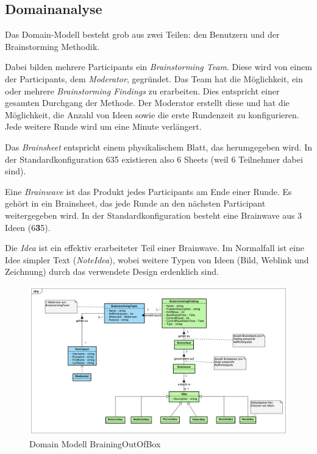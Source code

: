 \subsection{Domainanalyse}

Das Domain-Modell besteht grob aus zwei Teilen: den Benutzern und der Brainstorming Methodik. 

Dabei bilden mehrere Participants ein \textit{Brainstorming Team}. Diese wird von einem der Participants, dem \textit{Moderator}, gegründet.  Das Team hat die Möglichkeit, ein oder mehrere \textit{Brainstorming Findings} zu erarbeiten. Dies entspricht einer gesamten Durchgang der Methode. Der Moderator erstellt diese und hat die Möglichkeit, die Anzahl von Ideen sowie die erste Rundenzeit zu konfigurieren. Jede weitere Runde wird um eine Minute verlängert.

Das \textit{Brainsheet} entspricht einem physikalischem Blatt, das herumgegeben wird. In der Standardkonfiguration 635 existieren also 6 Sheets (weil 6 Teilnehmer dabei sind).

Eine \textit{Brainwave} ist das Produkt jedes Participants am Ende einer Runde. Es gehört in ein Brainsheet, das jede Runde an den nächsten Participant weitergegeben wird. In der Standardkonfiguration besteht eine Brainwave aus 3 Ideen (6\textbf{3}5).

Die \textit{Idea} ist ein effektiv erarbeiteter Teil einer Brainwave. Im Normalfall ist eine Idee simpler Text (\textit{NoteIdea}), wobei weitere Typen von Ideen (Bild, Weblink und Zeichnung) durch das verwendete Design erdenklich sind. 
\begin{figure}[h]
	\centering
	\includegraphics[width=1\linewidth]{img/domain-analyse/DomainModell-Methode635}
	\caption{Domain Modell BrainingOutOfBox}
	\label{fig:domainmodell-methode635}
\end{figure}

